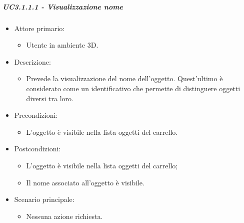 \subparagraph{UC3.1.1.1 - Visualizzazione nome}
\begin{itemize}
	
	\item Attore primario: 
	\begin{itemize}
		\item Utente in ambiente 3D.
	\end{itemize}
	\item Descrizione:
	\begin{itemize}
		\item Prevede la visualizzazione del nome dell’oggetto. Quest'ultimo è considerato come un identificativo che permette di distinguere oggetti diversi tra loro.
	\end{itemize}
	
	\item Precondizioni:
	\begin{itemize}
		\item L'oggetto è visibile nella lista oggetti del carrello.
	\end{itemize}
	
	\item Postcondizioni:
	\begin{itemize}
		\item L'oggetto è visibile nella lista oggetti del carrello;
		\item Il nome associato all'oggetto è visibile.
	\end{itemize}
	
	\item Scenario principale:
	\begin{itemize}
		\item Nessuna azione richiesta.
	\end{itemize}
	
\end{itemize}


